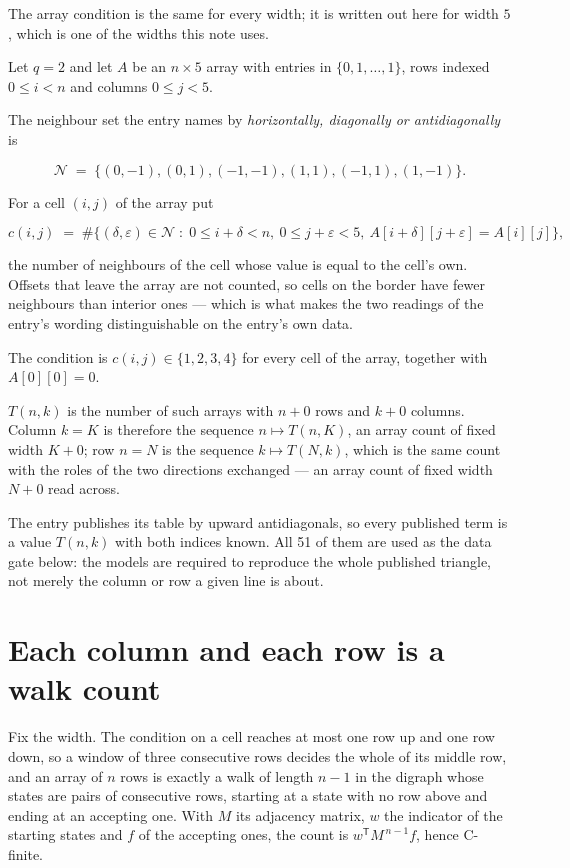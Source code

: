 \documentclass[11pt]{article}
\theoremstyle{definition}
\begin{document}
The array condition is the same for every width; it is written out here for width $5$, which is one of the widths this note uses.

Let $q = 2$ and let $A$ be an $n \times 5$ array with entries in $\{0,1,\dots,1\}$, rows indexed $0 \le i < n$ and columns $0 \le j < 5$.

The neighbour set the entry names by {\itshape horizontally, diagonally or antidiagonally} is

\[\mathcal{N} \;=\; \{(0,-1), (0,1), (-1,-1), (1,1), (-1,1), (1,-1)\}.\]

For a cell $(i,j)$ of the array put

\[c(i,j) \;=\; \#\bigl\{(\delta,\varepsilon)\in\mathcal{N} \;:\; 0\le i+\delta<n,\ 0\le j+\varepsilon<5,\ A[i+\delta][j+\varepsilon] = A[i][j]\bigr\},\]

the number of neighbours of the cell whose value is equal to the cell's own. Offsets that leave the array are not counted, so cells on the border have fewer neighbours than interior ones --- which is what makes the two readings of the entry's wording distinguishable on the entry's own data.

The condition is $c(i,j) \in \{1, 2, 3, 4\}$ for every cell of the array, together with $A[0][0]=0$.

$T(n,k)$ is the number of such arrays with $n + 0$ rows and $k + 0$ columns. Column $k = K$ is therefore the sequence $n \mapsto T(n,K)$, an array count of fixed width $K + 0$; row $n = N$ is the sequence $k \mapsto T(N,k)$, which is the same count with the roles of the two directions exchanged --- an array count of fixed width $N + 0$ read across.

The entry publishes its table by upward antidiagonals, so every published term is a value $T(n,k)$ with both indices known. All 51 of them are used as the data gate below: the models are required to reproduce the whole published triangle, not merely the column or row a given line is about.

\section{Each column and each row is a walk count}

Fix the width. The condition on a cell reaches at most one row up and one row down, so a window of three consecutive rows decides the whole of its middle row, and an array of $n$ rows is exactly a walk of length $n-1$ in the digraph whose states are pairs of consecutive rows, starting at a state with no row above and ending at an accepting one. With $M$ its adjacency matrix, $w$ the indicator of the starting states and $f$ of the accepting ones, the count is $w^{\mathsf T}M^{\,n-1}f$, hence C-finite.
\end{document}
